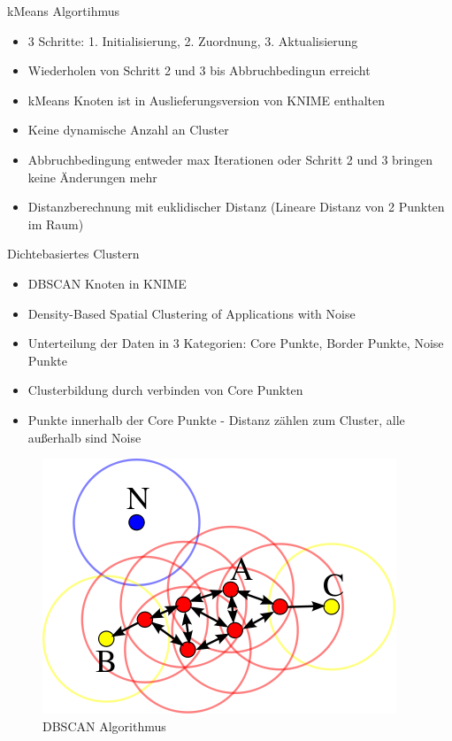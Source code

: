 \documentclass[
	handout,
  	aspectratio=169
]{beamer}
\begin{document}
	\begin{frame}{kMeans Algortihmus}
	\begin{itemize}
	\item 3 Schritte: 1. Initialisierung, 2. Zuordnung, 3. Aktualisierung
	\item Wiederholen von Schritt 2 und 3 bis Abbruchbedingun erreicht
	\item kMeans Knoten ist in Auslieferungsversion von KNIME enthalten
	\item Keine dynamische Anzahl an Cluster
	\item Abbruchbedingung entweder max Iterationen oder Schritt 2 und 3 bringen keine Änderungen mehr
	\item Distanzberechnung mit euklidischer Distanz (Lineare Distanz von 2 Punkten im Raum)
	\end{itemize}
	\end{frame}
	\begin{frame}{Dichtebasiertes Clustern}
	\begin{itemize}
	\item DBSCAN Knoten in KNIME
	\item Density-Based Spatial Clustering of Applications with Noise
	\item Unterteilung der Daten in 3 Kategorien: Core Punkte, Border Punkte, Noise Punkte
	\item Clusterbildung durch verbinden von Core Punkten
	\item Punkte innerhalb der Core Punkte - Distanz zählen zum Cluster, alle außerhalb sind Noise
	\end{itemize}
	\end{frame}
	\begin{frame}
	\begin{center}
				\begin{figure}[h]
					\includegraphics[scale=0.5]{../pictures/dbscan.png}
					\caption{DBSCAN Algorithmus}		
				\end{figure}		
			\end{center}	
	\end{frame}
	
\end{document}
